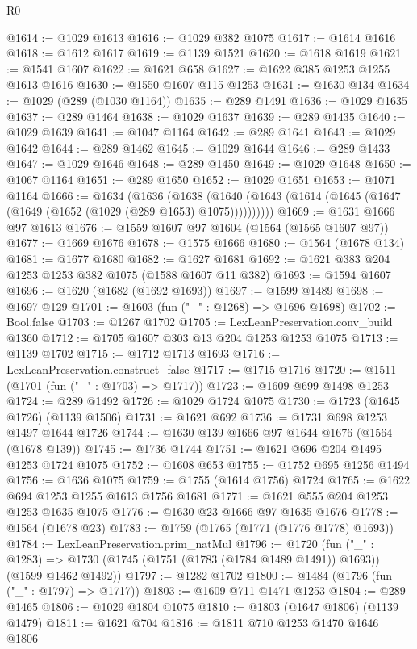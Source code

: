 \begin{lexlean}{R0}
\begin{coremodule}
@1614 := @1029 @1613
@1616 := @1029 @382 @1075
@1617 := @1614 @1616
@1618 := @1612 @1617
@1619 := @1139 @1521
@1620 := @1618 @1619
@1621 := @1541 @1607
@1622 := @1621 @658
@1627 := @1622 @385 @1253 @1255 @1613 @1616
@1630 := @1550 @1607 @115 @1253
@1631 := @1630 @134
@1634 := @1029 (@289 (@1030 @1164))
@1635 := @289 @1491
@1636 := @1029 @1635
@1637 := @289 @1464
@1638 := @1029 @1637
@1639 := @289 @1435
@1640 := @1029 @1639
@1641 := @1047 @1164
@1642 := @289 @1641
@1643 := @1029 @1642
@1644 := @289 @1462
@1645 := @1029 @1644
@1646 := @289 @1433
@1647 := @1029 @1646
@1648 := @289 @1450
@1649 := @1029 @1648
@1650 := @1067 @1164
@1651 := @289 @1650
@1652 := @1029 @1651
@1653 := @1071 @1164
@1666 := @1634
    (@1636
      (@1638 (@1640 (@1643 (@1614 (@1645 (@1647 (@1649 (@1652 (@1029 (@289 @1653) @1075))))))))))
@1669 := @1631 @1666 @97 @1613
@1676 := @1559 @1607 @97 @1604 (@1564 (@1565 @1607 @97))
@1677 := @1669 @1676
@1678 := @1575 @1666
@1680 := @1564 (@1678 @134)
@1681 := @1677 @1680
@1682 := @1627 @1681
@1692 := @1621 @383 @204 @1253 @1253 @382 @1075 (@1588 @1607 @11 @382)
@1693 := @1594 @1607
@1696 := @1620 (@1682 (@1692 @1693))
@1697 := @1599 @1489
@1698 := @1697 @129
@1701 := @1603 (fun ("_" : @1268) => @1696 @1698)
@1702 := Bool.false
@1703 := @1267 @1702
@1705 := LexLeanPreservation.conv_build @1360
@1712 := @1705 @1607 @303 @13 @204 @1253 @1253 @1075
@1713 := @1139 @1702
@1715 := @1712 @1713 @1693
@1716 := LexLeanPreservation.construct_false
@1717 := @1715 @1716
@1720 := @1511 (@1701 (fun ("_" : @1703) => @1717))
@1723 := @1609 @699 @1498 @1253
@1724 := @289 @1492
@1726 := @1029 @1724 @1075
@1730 := @1723 (@1645 @1726) (@1139 @1506)
@1731 := @1621 @692
@1736 := @1731 @698 @1253 @1497 @1644 @1726
@1744 := @1630 @139 @1666 @97 @1644 @1676 (@1564 (@1678 @139))
@1745 := @1736 @1744
@1751 := @1621 @696 @204 @1495 @1253 @1724 @1075
@1752 := @1608 @653
@1755 := @1752 @695 @1256 @1494
@1756 := @1636 @1075
@1759 := @1755 (@1614 @1756) @1724
@1765 := @1622 @694 @1253 @1255 @1613 @1756 @1681
@1771 := @1621 @555 @204 @1253 @1253 @1635 @1075
@1776 := @1630 @23 @1666 @97 @1635 @1676
@1778 := @1564 (@1678 @23)
@1783 := @1759 (@1765 (@1771 (@1776 @1778) @1693))
@1784 := LexLeanPreservation.prim_natMul
@1796 := @1720
    (fun ("_" : @1283) =>
    @1730 (@1745 (@1751 (@1783 (@1784 @1489 @1491)) @1693)) (@1599 @1462 @1492))
@1797 := @1282 @1702
@1800 := @1484 (@1796 (fun ("_" : @1797) => @1717))
@1803 := @1609 @711 @1471 @1253
@1804 := @289 @1465
@1806 := @1029 @1804 @1075
@1810 := @1803 (@1647 @1806) (@1139 @1479)
@1811 := @1621 @704
@1816 := @1811 @710 @1253 @1470 @1646 @1806

\end{coremodule}
\end{lexlean}
